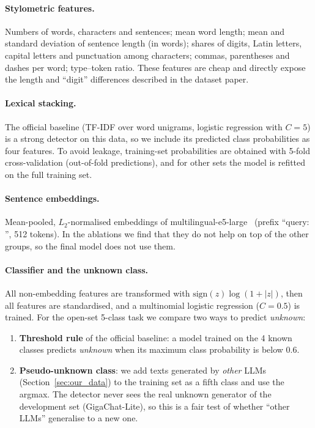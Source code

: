 \documentclass{article}
\begin{document}
\paragraph{Stylometric features.}
Numbers of words, characters and sentences; mean word length; mean and standard deviation of sentence length (in words); shares of digits, Latin letters, capital letters and punctuation among characters; commas, parentheses and dashes per word; type--token ratio. These features are cheap and directly expose the length and ``digit'' differences described in the dataset paper.

\paragraph{Lexical stacking.}
The official baseline (TF-IDF over word unigrams, logistic regression with $C=5$) is a strong detector on this data, so we include its predicted class probabilities as four features. To avoid leakage, training-set probabilities are obtained with 5-fold cross-validation (out-of-fold predictions), and for other sets the model is refitted on the full training set.

\paragraph{Sentence embeddings.}
Mean-pooled, $L_2$-normalised embeddings of multilingual-e5-large~\cite{e5} (prefix ``query: '', 512 tokens). In the ablations we find that they do not help on top of the other groups, so the final model does not use them.

\paragraph{Classifier and the unknown class.}
All non-embedding features are transformed with $\mathrm{sign}(z)\log(1+|z|)$, then all features are standardised, and a multinomial logistic regression ($C=0.5$) is trained. For the open-set 5-class task we compare two ways to predict \emph{unknown}:
\begin{enumerate}
\item \textbf{Threshold rule} of the official baseline: a model trained on the 4 known classes predicts \emph{unknown} when its maximum class probability is below $0.6$.
\item \textbf{Pseudo-unknown class}: we add texts generated by \emph{other} LLMs (Section~\ref{sec:our_data}) to the training set as a fifth class and use the argmax. The detector never sees the real unknown generator of the development set (GigaChat-Lite), so this is a fair test of whether ``other LLMs'' generalise to a new one.
\end{enumerate}
\end{document}
